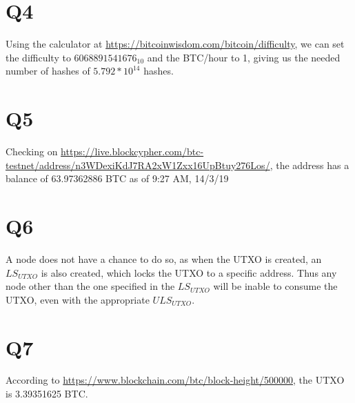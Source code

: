 \documentclass{article}
\begin{document}
\section{Q4}
Using the calculator at \url{https://bitcoinwisdom.com/bitcoin/difficulty}, we can set the difficulty to $6068891541676_{10}$ and the BTC/hour to 1, giving us the needed number of hashes of $5.792 * 10^{14}$ hashes.

\section{Q5}
Checking on \url{https://live.blockcypher.com/btc-testnet/address/n3WDexiKdJ7RA2xW1Zxx16UpBtuy276Los/}, the address has a balance of 63.97362886 BTC as of 9:27 AM, 14/3/19

\section {Q6}
A node does not have a chance to do so, as when the UTXO is created, an $LS_{UTXO}$ is also created, which locks the UTXO to a specific address. Thus any node other than the one specified in the $LS_{UTXO}$ will be inable to consume the UTXO, even with the appropriate $ULS_{UTXO}$.

\section{Q7}
According to \url{https://www.blockchain.com/btc/block-height/500000}, the UTXO is 3.39351625 BTC.
\end{document}
